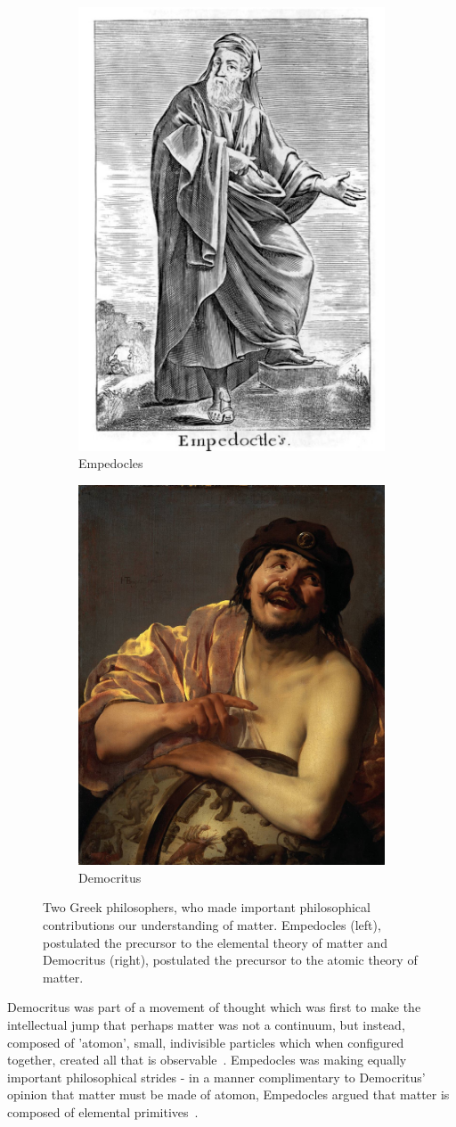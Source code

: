 \begin{figure}[ht]
	\centering
	\begin{subfigure}{.5\textwidth}
		\centering
		\includegraphics[width=0.4\linewidth]{./figures/empedocles.jpg}
		\caption{Empedocles \cite{Stanley1655}}
		\label{fig:empedocles}
	\end{subfigure}%
	\begin{subfigure}{0.5\textwidth}
		\centering
		\includegraphics[width=0.4\linewidth]{./figures/democritus.jpg}
		\caption{Democritus \cite{Brugghen1628}}
		\label{fig:democritus}
	\end{subfigure}
  \caption{ 
    Two Greek philosophers, who made important philosophical
    contributions our understanding of matter. Empedocles (left), postulated the
    precursor to the elemental theory of matter\cite{Long1949} and Democritus
    (right), postulated the precursor to the atomic theory of matter.  
  }
	\label{fig:atomists}
\end{figure}

Democritus was part of a movement of thought which was first to make the
intellectual jump that perhaps matter was not a continuum, but instead, composed
of 'atomon', small, indivisible particles which when configured together, created
all that is observable~\cite{Baldes1978}. Empedocles was making equally important
philosophical strides - in a manner complimentary to Democritus' opinion that
matter must be made of atomon, Empedocles argued that matter is composed of
elemental primitives~\cite{Long1949}.

